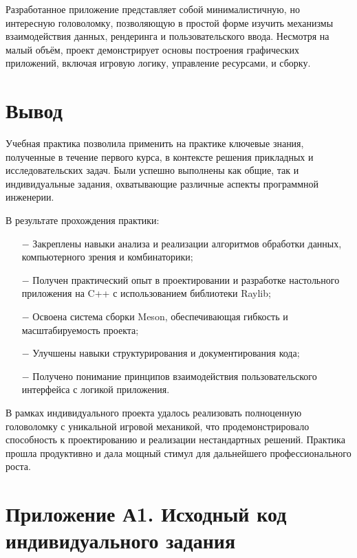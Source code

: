 \documentclass[oneside,a4paper,14pt]{extarticle}
\begin{document}
Разработанное приложение представляет собой минималистичную, но интересную головоломку, позволяющую в простой форме изучить механизмы взаимодействия данных, рендеринга и пользовательского ввода. Несмотря на малый объём, проект демонстрирует основы построения графических приложений, включая игровую логику, управление ресурсами, и сборку.

\clearpage

\section{Вывод}

Учебная практика позволила применить на практике ключевые знания, полученные в течение первого курса, в контексте решения прикладных и исследовательских задач. Были успешно выполнены как общие, так и индивидуальные задания, охватывающие различные аспекты программной инженерии.

В результате прохождения практики:

\begin{itemize}
\item[$-$] Закреплены навыки анализа и реализации алгоритмов обработки данных, компьютерного зрения и комбинаторики;
\item[$-$] Получен практический опыт в проектировании и разработке настольного приложения на C++ с использованием библиотеки Raylib;
\item[$-$] Освоена система сборки Meson, обеспечивающая гибкость и масштабируемость проекта;
\item[$-$] Улучшены навыки структурирования и документирования кода;
\item[$-$] Получено понимание принципов взаимодействия пользовательского интерфейса с логикой приложения.
\end{itemize}

В рамках индивидуального проекта удалось реализовать полноценную головоломку с уникальной игровой механикой, что продемонстрировало способность к проектированию и реализации нестандартных решений. Практика прошла продуктивно и дала мощный стимул для дальнейшего профессионального роста.

\newpage


\section{Приложение А1. Исходный код индивидуального задания}
\inputminted{cpp}{ternary_tiles/src/main.cpp}
\end{document}
